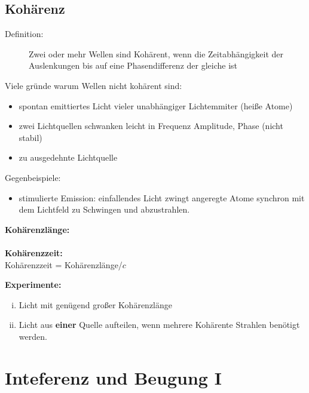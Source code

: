 \subsection{Kohärenz}

\begin{description}
	\item[Definition:] Zwei oder mehr Wellen sind Kohärent, wenn die Zeitabhängigkeit der Auslenkungen bis auf eine Phasendifferenz der gleiche ist \mau
\end{description}
Viele gründe warum Wellen nicht kohärent sind:
\begin{itemize}
	\item spontan emittiertes Licht vieler unabhängiger Lichtemmiter (heiße Atome)
	\item zwei Lichtquellen schwanken leicht in Frequenz Amplitude, Phase (nicht stabil)
	\item zu ausgedehnte Lichtquelle
\end{itemize}
Gegenbeispiele:
\begin{itemize}
	\item stimulierte Emission: einfallendes Licht zwingt angeregte Atome synchron mit dem Lichtfeld zu Schwingen und abzustrahlen.
\end{itemize}
\textbf{Kohärenzlänge:}\\
\\
\textbf{Kohärenzzeit:}\\
Kohärenzzeit = Kohärenzlänge/$c$

\noindent
\textbf{Experimente:}
\begin{enumerate}[(i)]
	\item Licht mit genügend großer Kohärenzlänge
	\item Licht aus \textbf{einer} Quelle aufteilen, wenn mehrere Kohärente Strahlen benötigt werden.
\end{enumerate}



\section{Inteferenz und Beugung I}

